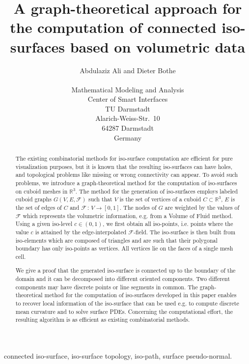\documentclass[a4paper,11pt]{article}
\begin{document}
\title{A graph-theoretical approach for the computation of connected iso-surfaces based on
volumetric data}
\author{Abdulaziz Ali and Dieter Bothe\\
\mbox{}\\
Mathematical Modeling and Analysis\\
Center of Smart Interfaces\\
TU Darmstadt\\
Alarich-Weiss-Str.\ 10\\
64287 Darmstadt\\
Germany}
\maketitle
\newpage
\tableofcontents
\newpage
\begin{abstract}
The existing combinatorial methods for iso-surface computation are efficient for pure visualization purposes,
but it is known that the resulting iso-surfaces can have holes, and topological problems like missing or wrong connectivity
can appear. To avoid such problems, we introduce a graph-theoretical method for the computation of iso-surfaces on cuboid
meshes in $\mathbb{R}^3$. The method for the generation of iso-surfaces employs labeled cuboid graphs
$G(V,E,\mathcal{F})$ such that $V$ is the set of vertices of a cuboid $C\subset\mathbb{R}^3$, $E$ is the set of
edges of $C$ and $\mathcal{F}\,:\,V\rightarrow [0,1]$. The nodes of $G$ are weighted by the values of $\mathcal{F}$
which represents the volumetric information, e.g. from a Volume of Fluid method. Using a given iso-level
$c\in (0,1)$, we first obtain all iso-points, i.e. points where the value $c$ is attained by the edge-interpolated
$\mathcal{F}$-field. The iso-surface is then built from iso-elements which are composed of triangles and are
such that their polygonal boundary has only iso-points as vertices. All vertices lie on the faces of a single mesh cell.

We give a proof that the generated iso-surface is connected up to the boundary of the domain and it can be
decomposed into different oriented components. Two different components may have discrete points or line segments
in common. The graph-theoretical method for the computation of iso-surfaces developed in this paper enables to
recover local information of the iso-surface that can be used e.g. to compute discrete mean curvature and to
solve surface PDEs. Concerning the computational effort, the resulting
algorithm is as efficient as existing combinatorial methods.
\end{abstract}
 connected iso-surface, iso-surface topology, iso-path, surface pseudo-normal.
\newpage
\end{document}
